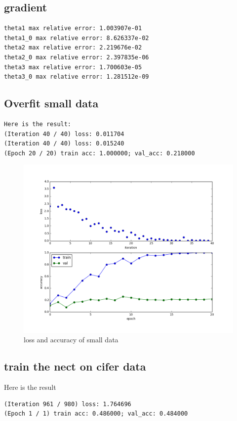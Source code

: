 \documentclass[12pt]{article}
\begin{document}
\subsection*{gradient}

\begin{lstlisting}
theta1 max relative error: 1.003907e-01
theta1_0 max relative error: 8.626337e-02
theta2 max relative error: 2.219676e-02
theta2_0 max relative error: 2.397835e-06
theta3 max relative error: 1.700603e-05
theta3_0 max relative error: 1.281512e-09
\end{lstlisting}
\subsection*{Overfit small data}
\begin{lstlisting}
Here is the result:
(Iteration 40 / 40) loss: 0.011704
(Iteration 40 / 40) loss: 0.015240
(Epoch 20 / 20) train acc: 1.000000; val_acc: 0.218000
\end{lstlisting}
\begin{figure}[H]
  \caption{loss and accuracy of small data}
  \centering
    \includegraphics[scale=0.5]{smalldata.png}
\end{figure}


\subsection*{train the nect on cifer data}
Here is the result
\begin{lstlisting}
(Iteration 961 / 980) loss: 1.764696
(Epoch 1 / 1) train acc: 0.486000; val_acc: 0.484000
\end{lstlisting}
\end{document}
